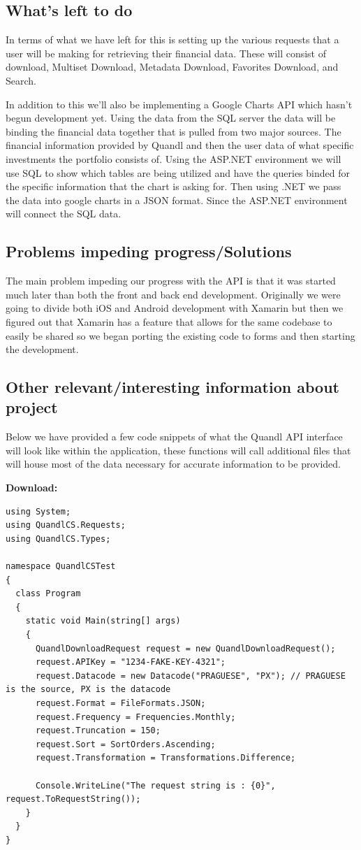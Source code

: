 \documentclass[letterpaper,10pt,titlepage,journal,compsoc,draftclsnofoot,onecolumn]{IEEEtran}
\begin{document}
\subsection{What's left to do}

In terms of what we have left for this is setting up the various requests that a user will be making for retrieving their financial data. These will consist of download, Multiset Download, Metadata Download, Favorites Download, and Search.
 
 In addition to this we’ll also be implementing a Google Charts API which hasn’t begun development yet. Using the data from the SQL server the data will be binding the financial data together that is pulled from two major sources. The financial information provided by Quandl and then the user data of what specific investments the portfolio consists of. Using the ASP.NET environment we will use SQL to show which tables are being utilized and have the queries binded for the specific information that the chart is asking for. Then using .NET we pass the data into google charts in a JSON format. Since the ASP.NET environment will connect the SQL data.
 
\subsection{Problems impeding progress/Solutions}

The main problem impeding our progress with the API is that it was started much later than both the front and back end development. Originally we were going to divide both iOS and Android development with Xamarin but then we figured out that Xamarin has a feature that allows for the same codebase to easily be shared so we began porting the existing code to forms and then starting the development. 

\subsection{Other relevant/interesting information about project}

Below we have provided a few code snippets of what the Quandl API interface will look like within the application, these functions will call additional files that will house most of the data necessary for accurate information to be provided. 

 \textbf{Download:} 
\begin{lstlisting}
using System;
using QuandlCS.Requests;
using QuandlCS.Types;

namespace QuandlCSTest
{
  class Program
  {
    static void Main(string[] args)
    {
      QuandlDownloadRequest request = new QuandlDownloadRequest();
      request.APIKey = "1234-FAKE-KEY-4321";
      request.Datacode = new Datacode("PRAGUESE", "PX"); // PRAGUESE is the source, PX is the datacode
      request.Format = FileFormats.JSON;
      request.Frequency = Frequencies.Monthly;
      request.Truncation = 150;
      request.Sort = SortOrders.Ascending;
      request.Transformation = Transformations.Difference;

      Console.WriteLine("The request string is : {0}", request.ToRequestString());
    }
  }
}
\end{lstlisting}
\end{document}
